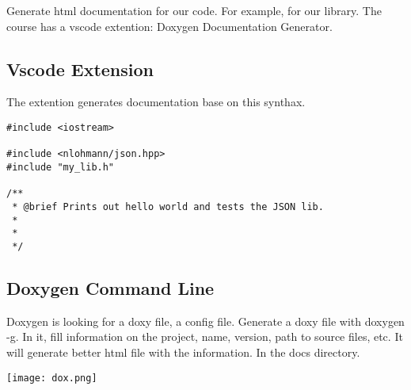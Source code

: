 Generate html documentation for our code. For example, for our library. The course has a vscode extention: Doxygen Documentation Generator.

\subsection{Vscode Extension}

The extention generates documentation base on this synthax.

\begin{verbatim}
#include <iostream>

#include <nlohmann/json.hpp>
#include "my_lib.h"

/**
 * @brief Prints out hello world and tests the JSON lib.
 *
 *
 */
\end{verbatim}

\subsection{Doxygen Command Line}

Doxygen is looking for a doxy file, a config file. Generate a doxy file with doxygen -g.
In it, fill information on the project, name, version,  path to source files, etc. It will generate better html file with the information.
In the docs directory.

\begin{center}
    \texttt{[image: dox.png]}
\end{center}

